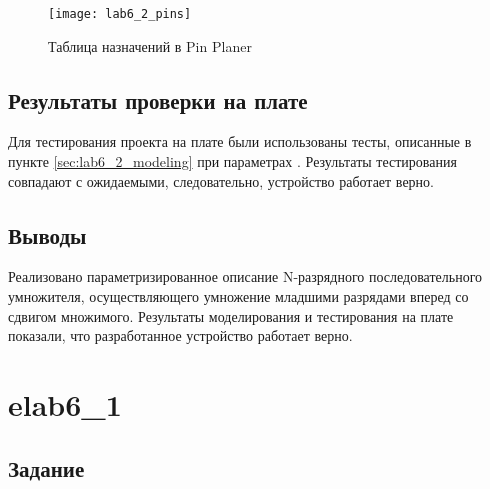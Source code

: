 \begin{figure}[H]
\begin{center}
	\texttt{[image: lab6\_2\_pins]}
	\caption{Таблица назначений в Pin Planer}
	\label{fig:lab6_2_pins}
\end{center}
\end{figure}

\subsection{Результаты проверки на плате}

Для тестирования проекта на плате были использованы тесты, описанные в пункте \ref{sec:lab6_2_modeling} при параметрах . Результаты тестирования совпадают с ожидаемыми, следовательно, устройство работает верно.

\subsection{Выводы}

Реализовано параметризированное описание N-разрядного последовательного умножителя, осуществляющего умножение младшими разрядами вперед со сдвигом множимого. Результаты моделирования и тестирования на плате показали, что разработанное устройство работает верно.

\newpage

\section{elab6\_1}

\subsection{Задание}

